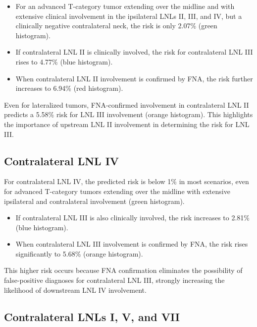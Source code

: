 \documentclass[
  sn-mathphys-num,
]{sn-jnl}
\providecommand{\tightlist}{%
  \setlength{\itemsep}{0pt}\setlength{\parskip}{0pt}}\usepackage{longtable,booktabs,array}
\begin{document}
\begin{itemize}
\tightlist
\item
  For an advanced T-category tumor extending over the midline and with
  extensive clinical involvement in the ipsilateral LNLs II, III, and
  IV, but a clinically negative contralateral neck, the risk is only
  2.07\% (green histogram).\\
\item
  If contralateral LNL II is clinically involved, the risk for
  contralateral LNL III rises to 4.77\% (blue histogram).\\
\item
  When contralateral LNL II involvement is confirmed by FNA, the risk
  further increases to 6.94\% (red histogram).
\end{itemize}

Even for lateralized tumors, FNA-confirmed involvement in contralateral
LNL II predicts a 5.58\% risk for LNL III involvement (orange
histogram). This highlights the importance of upstream LNL II
involvement in determining the risk for LNL III.

\subsection{Contralateral LNL IV}\label{contralateral-lnl-iv}

For contralateral LNL IV, the predicted risk is below 1\% in most
scenarios, even for advanced T-category tumors extending over the
midline with extensive ipsilateral and contralateral involvement (green
histogram).

\begin{itemize}
\tightlist
\item
  If contralateral LNL III is also clinically involved, the risk
  increases to 2.81\% (blue histogram).\\
\item
  When contralateral LNL III involvement is confirmed by FNA, the risk
  rises significantly to 5.68\% (orange histogram).
\end{itemize}

This higher risk occurs because FNA confirmation eliminates the
possibility of false-positive diagnoses for contralateral LNL III,
strongly increasing the likelihood of downstream LNL IV involvement.

\subsection{Contralateral LNLs I, V, and
VII}\label{contralateral-lnls-i-v-and-vii}
\end{document}
